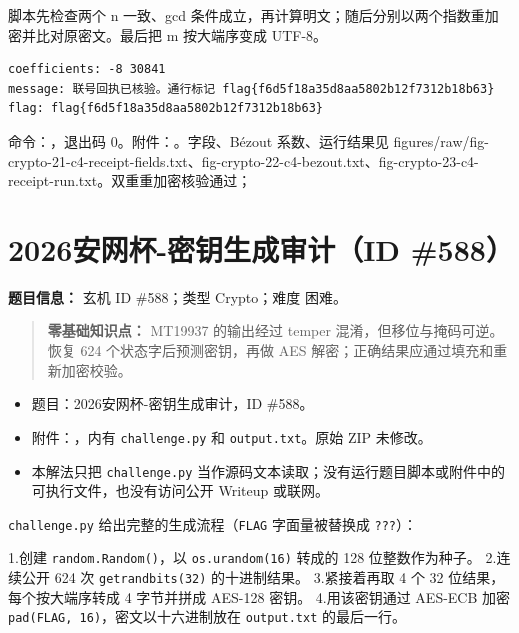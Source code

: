脚本先检查两个 n 一致、gcd 条件成立，再计算明文；随后分别以两个指数重加密并比对原密文。最后把 m 按大端序变成 UTF-8。

\begin{verbatim}
coefficients: -8 30841
message: 联号回执已核验。通行标记 flag{f6d5f18a35d8aa5802b12f7312b18b63}
flag: flag{f6d5f18a35d8aa5802b12f7312b18b63}
\end{verbatim}

命令：\texttt{}，退出码 0。附件：\texttt{}。字段、Bézout 系数、运行结果见 figures/raw/fig-crypto-21-c4-receipt-fields.txt、fig-crypto-22-c4-bezout.txt、fig-crypto-23-c4-receipt-run.txt。双重重加密核验通过；

\section{2026安网杯-密钥生成审计（ID \#588）}\label{ux5b89ux7f51ux676f-ux5bc6ux94a5ux751fux6210ux5ba1ux8ba1id-588}

\textbf{题目信息：} 玄机 ID \#588；类型 Crypto；难度 困难。

\begin{quote}
\textbf{零基础知识点：} MT19937 的输出经过 temper 混淆，但移位与掩码可逆。恢复 624 个状态字后预测密钥，再做 AES 解密；正确结果应通过填充和重新加密校验。
\end{quote}

\begin{itemize}
\item
  题目：2026安网杯-密钥生成审计，ID \#588。
\item
  附件：\texttt{}，内有 \texttt{challenge.py} 和 \texttt{output.txt}。原始 ZIP 未修改。
\item
  本解法只把 \texttt{challenge.py} 当作源码文本读取；没有运行题目脚本或附件中的可执行文件，也没有访问公开 Writeup 或联网。
\end{itemize}

\texttt{challenge.py} 给出完整的生成流程（\texttt{FLAG} 字面量被替换成 \texttt{???}）：

1.创建 \texttt{random.Random()}，以 \texttt{os.urandom(16)} 转成的 128 位整数作为种子。 2.连续公开 624 次 \texttt{getrandbits(32)} 的十进制结果。 3.紧接着再取 4 个 32 位结果，每个按大端序转成 4 字节并拼成 AES-128 密钥。 4.用该密钥通过 AES-ECB 加密 \texttt{pad(FLAG,\ 16)}，密文以十六进制放在 \texttt{output.txt} 的最后一行。

